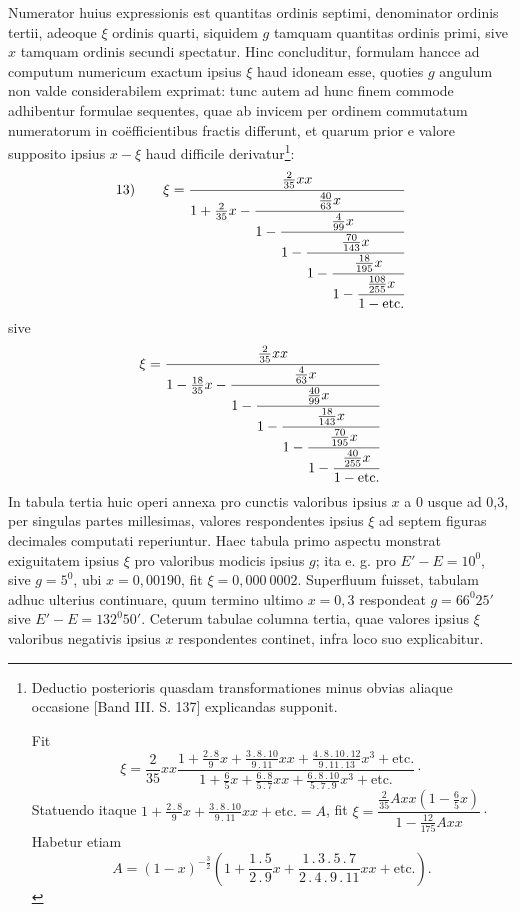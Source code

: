 Numerator huius expressionis est quantitas ordinis septimi, denominator ordinis tertii, adeoque $\xi$ ordinis quarti, siquidem $g$ tamquam quantitas ordinis primi, sive $x$ tamquam ordinis secundi spectatur. Hinc concluditur, formulam hancce ad computum numericum exactum ipsius $\xi$ haud idoneam esse, quoties $g$ angulum non valde considerabilem exprimat: tunc autem ad hunc finem commode adhibentur formulae sequentes, quae ab invicem per ordinem commutatum numeratorum in coëfficientibus fractis differunt, et quarum prior e valore supposito ipsius $x-\xi$ haud difficile derivatur\footnote{Deductio posterioris quasdam transformationes minus obvias aliaque occasione [Band III. S. 137] explicandas supponit.
\par [Handschriftliche Bemerkung:] Fit
\[
\xi=\dfrac{2}{35}xx\dfrac{1+\frac{2\mathbin{.}8}{9}x+\frac{3\mathbin{.}8\mathbin{.}10}{9\mathbin{.}11}xx+\frac{4\mathbin{.}8\mathbin{.}10\mathbin{.}12}{9\mathbin{.}11\mathbin{.}13}x^3+\text{etc.}}{1+\frac65x+\frac{6\mathbin{.}8}{5\mathbin{.}7}xx+\frac{6\mathbin{.}8\mathbin{.}10}{5\mathbin{.}7\mathbin{.}9}x^3+\text{etc.}}\mathpunct{\cdot}
\]
Statuendo itaque $1+\frac{2\mathbin{.}8}{9}x+\frac{3\mathbin{.}8\mathbin{.}10}{9\mathbin{.}11}xx+\text{etc.}=A$, fit $\xi=\dfrac{\frac{2}{35}Axx(1-\frac65x)}{1-\frac{12}{175}Axx}\mathpunct{\cdot}$ Habetur etiam
\[
A=(1-x)^{-\frac32}\left(1+\frac{1\mathbin{.}5}{2\mathbin{.}9}x+\frac{1\mathbin{.}3\mathbin{.}5\mathbin{.}7}{2\mathbin{.}4\mathbin{.}9\mathbin{.}11}xx+\text{etc.}\right).
\]
}:
\[
\mathrm{13)}\qquad \xi=\cfrac{\tfrac{2}{35}xx}{1+\tfrac{2}{35}x-\cfrac{\tfrac{40}{63}x}{1-\cfrac{\tfrac{4}{99}x}{1-\cfrac{\tfrac{70}{143}x}{1-\cfrac{\tfrac{18}{195}x}{1-\cfrac{\tfrac{108}{255}x}{1-\text{etc.}}}}}}}
\]
sive
\[
\xi=\cfrac{\tfrac{2}{35}xx}{1-\tfrac{18}{35}x-\cfrac{\tfrac{4}{63}x}{1-\cfrac{\tfrac{40}{99}x}{1-\cfrac{\tfrac{18}{143}x}{1-\cfrac{\tfrac{70}{195}x}{1-\cfrac{\tfrac{40}{255}x}{1-\text{etc.}}}}}}}
\]
In tabula tertia huic operi annexa pro cunctis valoribus ipsius $x$ a 0 usque ad 0,3, per singulas partes millesimas, valores respondentes ipsius $\xi$ ad septem figuras decimales computati reperiuntur. Haec tabula primo aspectu monstrat exiguitatem ipsius $\xi$ pro valoribus modicis ipsius $g$; ita e. g. pro $E'-E=10^0$, sive $g=5^0$, ubi $x=0{,}00190$, fit $\xi=0{,}000\ 0002$. Superfluum fuisset, tabulam adhuc ulterius continuare, quum termino ultimo $x=0{,}3$ respondeat $g=66^0 25'$ sive $E'-E=132^0 50'$. Ceterum tabulae columna tertia, quae valores ipsius $\xi$ valoribus negativis ipsius $x$ respondentes continet, infra loco suo explicabitur.
